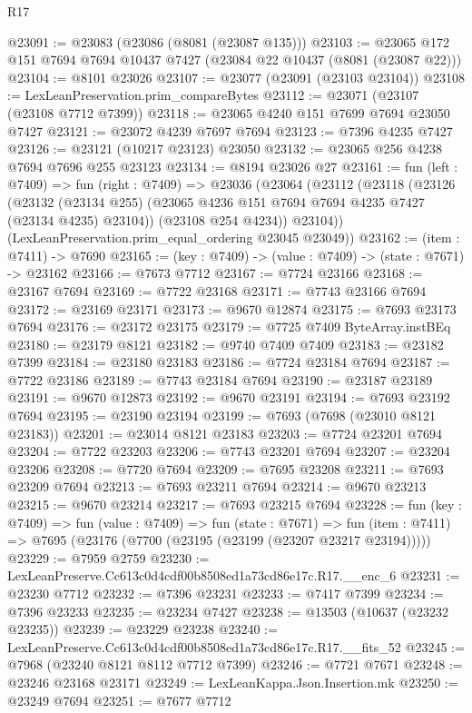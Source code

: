 \begin{lexlean}{R17}
\begin{coremodule}
@23091 := @23083 (@23086 (@8081 (@23087 @135)))
@23103 := @23065 @172 @151 @7694 @7694 @10437 @7427 (@23084 @22 @10437 (@8081 (@23087 @22)))
@23104 := @8101 @23026
@23107 := @23077 (@23091 (@23103 @23104))
@23108 := LexLeanPreservation.prim_compareBytes
@23112 := @23071 (@23107 (@23108 @7712 @7399))
@23118 := @23065 @4240 @151 @7699 @7694 @23050 @7427
@23121 := @23072 @4239 @7697 @7694
@23123 := @7396 @4235 @7427
@23126 := @23121 (@10217 @23123) @23050
@23132 := @23065 @256 @4238 @7694 @7696 @255 @23123
@23134 := @8194 @23026 @27
@23161 := fun (left : @7409) =>
  fun (right : @7409) =>
  @23036
    (@23064
      (@23112
        (@23118
          (@23126
            (@23132 (@23134 @255) (@23065 @4236 @151 @7694 @7694 @4235 @7427 (@23134 @4235) @23104))
            (@23108 @254 @4234))
          @23104))
      (LexLeanPreservation.prim_equal_ordering @23045 @23049))
@23162 := (item : @7411) -> @7690
@23165 := (key : @7409) -> (value : @7409) -> (state : @7671) -> @23162
@23166 := @7673 @7712
@23167 := @7724 @23166
@23168 := @23167 @7694
@23169 := @7722 @23168
@23171 := @7743 @23166 @7694
@23172 := @23169 @23171
@23173 := @9670 @12874
@23175 := @7693 @23173 @7694
@23176 := @23172 @23175
@23179 := @7725 @7409 ByteArray.instBEq
@23180 := @23179 @8121
@23182 := @9740 @7409 @7409
@23183 := @23182 @7399
@23184 := @23180 @23183
@23186 := @7724 @23184 @7694
@23187 := @7722 @23186
@23189 := @7743 @23184 @7694
@23190 := @23187 @23189
@23191 := @9670 @12873
@23192 := @9670 @23191
@23194 := @7693 @23192 @7694
@23195 := @23190 @23194
@23199 := @7693 (@7698 (@23010 @8121 @23183))
@23201 := @23014 @8121 @23183
@23203 := @7724 @23201 @7694
@23204 := @7722 @23203
@23206 := @7743 @23201 @7694
@23207 := @23204 @23206
@23208 := @7720 @7694
@23209 := @7695 @23208
@23211 := @7693 @23209 @7694
@23213 := @7693 @23211 @7694
@23214 := @9670 @23213
@23215 := @9670 @23214
@23217 := @7693 @23215 @7694
@23228 := fun (key : @7409) =>
  fun (value : @7409) =>
  fun (state : @7671) =>
  fun (item : @7411) => @7695 (@23176 (@7700 (@23195 (@23199 (@23207 @23217 @23194)))))
@23229 := @7959 @2759
@23230 := LexLeanPreserve.Cc613c0d4cdf00b8508ed1a73cd86e17c.R17.__enc_6
@23231 := @23230 @7712
@23232 := @7396 @23231
@23233 := @7417 @7399
@23234 := @7396 @23233
@23235 := @23234 @7427
@23238 := @13503 (@10637 (@23232 @23235))
@23239 := @23229 @23238
@23240 := LexLeanPreserve.Cc613c0d4cdf00b8508ed1a73cd86e17c.R17.__fits_52
@23245 := @7968 (@23240 @8121 @8112 @7712 @7399)
@23246 := @7721 @7671
@23248 := @23246 @23168 @23171
@23249 := LexLeanKappa.Json.Insertion.mk
@23250 := @23249 @7694
@23251 := @7677 @7712

\end{coremodule}
\end{lexlean}
